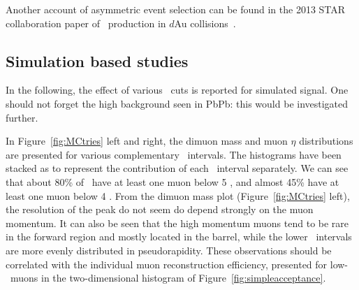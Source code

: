 Another account of asymmetric event selection can be found in the 2013
STAR collaboration paper of \PgU\ production in $d$Au collisions~\cite{Adamczyk:2013poh}.

\subsection{Simulation based studies}

In the following, the effect of various \pt\ cuts is reported for
simulated signal. One should not forget the high background seen in
PbPb: this would be investigated further.%

In Figure~\ref{fig:MCtries} left and right, the dimuon mass and muon
$\eta$ distributions are presented for various complementary \pt\ intervals. The
histograms have been stacked as to represent the contribution of each
\pt\ interval separately. We can see that about 80\% of \PgU\ 
have at least one muon below 5 \GeVc, and almost 45\% have at least one muon
below 4 \GeVc. From the dimuon mass plot (Figure~\ref{fig:MCtries}
left), the resolution of the peak do not seem do depend strongly on
the muon momentum. It can also be seen that the high momentum muons tend
to be rare in the forward region and mostly located in the barrel,
while the lower \pt\ intervals are more evenly distributed in
pseudorapidity. These observations should be correlated with the
individual muon reconstruction efficiency, presented for low-\pt\
muons in the two-dimensional histogram of Figure~\ref{fig:simpleacceptance}.

